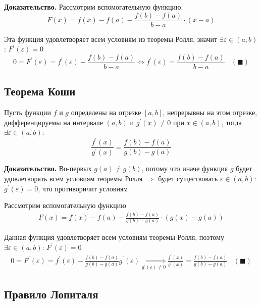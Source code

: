 \documentclass[class=article,a4paper,12pt,crop=false]{standalone}
\begin{document}
\textbf{Доказательство.} Рассмотрим вспомогательную функцию:
\begin{equation}
    F(x) = f(x) - f(a) - \frac{f(b) - f(a)}{b - a}\cdot{(x - a)}
\end{equation}

Эта функция удовлетворяет всем условиям из теоремы Ролля, значит $\exists \varepsilon \in (a, b)$: $F^{'}(\varepsilon) = 0$
\begin{equation}
    0 = F^{'}(\varepsilon) = f^{'}(\varepsilon) - \frac{f(b) - f(a)}{b - a} 
    \Leftrightarrow f^{'}(\varepsilon) = \frac{f(b) - f(a)}{b - a} \:\:\:\: (\blacksquare)
\end{equation}

\subsection{Теорема Коши}

Пусть функции $f$ и $g$ определены на отрезке $[a, b]$, непрерывны на этом отрезке,
дифференцируемы на интервале $(a, b)$ и $g^{'}(x) \neq 0$ при $x \in (a, b)$,
тогда $\exists \varepsilon \in (a, b)$:
\begin{equation}
    \frac{f^{'}(x)}{g^{'}(x)} = \frac{f(b) - f(a)}{g(b) - g(a)}
\end{equation}

\textbf{Доказательство.} Во-первых $g(a) \neq g(b)$, потому что иначе функция $g$ будет
удовлетворять всем условиям теоремы Ролля $\Rightarrow$ будет существовать $\varepsilon \in (a, b)$:
$g^{'}(\varepsilon) = 0$, что противоричит условиям

Рассмотрим вспомогательную функцию
\begin{eqnarray}
    F(x) = f(x) - f(a) - \frac{f(b) - f(a)}{g(b) - g(a)}\cdot(g(x) - g(a))
\end{eqnarray}

Данная функция удовлетворяет всем условиям теоремы Ролля, поэтому $\exists \varepsilon \in (a, b)$:
$F^{'}(\varepsilon) = 0$
\begin{eqnarray}
    0 = F^{'}(\varepsilon) = f^{'}(\varepsilon) - \frac{f(b) - f(a)}{g(b) - g(a)}g^{'}(\varepsilon)
    \underset{g^{'}(\varepsilon) \neq 0}{\Leftrightarrow} \frac{f^{'}(x)}{g^{'}(x)} = \frac{f(b) - f(a)}{g(b) - g(a)}
    \:\:\:\: (\blacksquare)
\end{eqnarray}

\subsection{Правило Лопиталя}
\end{document}
